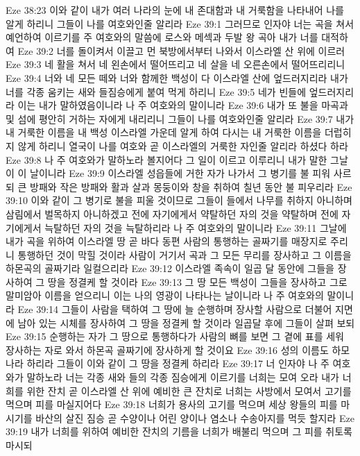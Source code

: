 Eze 38:23  이와 같이 내가 여러 나라의 눈에 내 존대함과 내 거룩함을 나타내어 나를 알게 하리니 그들이 나를 여호와인줄 알리라
Eze 39:1  그러므로 인자야 너는 곡을 쳐서 예언하여 이르기를 주 여호와의 말씀에 로스와 메섹과 두발 왕 곡아 내가 너를 대적하여
Eze 39:2  너를 돌이켜서 이끌고 먼 북방에서부터 나와서 이스라엘 산 위에 이르러
Eze 39:3  네 활을 쳐서 네 왼손에서 떨어뜨리고 네 살을 네 오른손에서 떨어뜨리리니
Eze 39:4  너와 네 모든 떼와 너와 함께한 백성이 다 이스라엘 산에 엎드러지리라 내가 너를 각종 움키는 새와 들짐승에게 붙여 먹게 하리니
Eze 39:5  네가 빈들에 엎드러지리라 이는 내가 말하였음이니라 나 주 여호와의 말이니라
Eze 39:6  내가 또 불을 마곡과 및 섬에 평안히 거하는 자에게 내리리니 그들이 나를 여호와인줄 알리라
Eze 39:7  내가 내 거룩한 이름을 내 백성 이스라엘 가운데 알게 하여 다시는 내 거룩한 이름을 더럽히지 않게 하리니 열국이 나를 여호와 곧 이스라엘의 거룩한 자인줄 알리라 하셨다 하라
Eze 39:8  나 주 여호와가 말하노라 볼지어다 그 일이 이르고 이루리니 내가 말한 그날이 이 날이니라
Eze 39:9  이스라엘 성읍들에 거한 자가 나가서 그 병기를 불 피워 사르되 큰 방패와 작은 방패와 활과 살과 몽둥이와 창을 취하여 칠년 동안 불 피우리라
Eze 39:10  이와 같이 그 병기로 불을 피울 것이므로 그들이 들에서 나무를 취하지 아니하며 삼림에서 벌목하지 아니하겠고 전에 자기에게서 약탈하던 자의 것을 약탈하며 전에 자기에게서 늑탈하던 자의 것을 늑탈하리라 나 주 여호와의 말이니라
Eze 39:11  그날에 내가 곡을 위하여 이스라엘 땅 곧 바다 동편 사람의 통행하는 골짜기를 매장지로 주리니 통행하던 것이 막힐 것이라 사람이 거기서 곡과 그 모든 무리를 장사하고 그 이름을 하몬곡의 골짜기라 일컬으리라
Eze 39:12  이스라엘 족속이 일곱 달 동안에 그들을 장사하여 그 땅을 정결케 할 것이라
Eze 39:13  그 땅 모든 백성이 그들을 장사하고 그로 말미암아 이름을 얻으리니 이는 나의 영광이 나타나는 날이니라 나 주 여호와의 말이니라
Eze 39:14  그들이 사람을 택하여 그 땅에 늘 순행하며 장사할 사람으로 더불어 지면에 남아 있는 시체를 장사하여 그 땅을 정결케 할 것이라 일곱달 후에 그들이 살펴 보되
Eze 39:15  순행하는 자가 그 땅으로 통행하다가 사람의 뼈를 보면 그 곁에 표를 세워 장사하는 자로 와서 하몬곡 골짜기에 장사하게 할 것이요
Eze 39:16  성의 이름도 하모나라 하리라 그들이 이와 같이 그 땅을 정결케 하리라
Eze 39:17  너 인자야 나 주 여호와가 말하노라 너는 각종 새와 들의 각종 짐승에게 이르기를 너희는 모여 오라 내가 너희를 위한 잔치 곧 이스라엘 산 위에 예비한 큰 잔치로 너희는 사방에서 모여서 고기를 먹으며 피를 마실지어다
Eze 39:18  너희가 용사의 고기를 먹으며 세상 왕들의 피를 마시기를 바산의 살진 짐승 곧 수양이나 어린 양이나 염소나 수송아지를 먹듯 할지라
Eze 39:19  내가 너희를 위하여 예비한 잔치의 기름을 너희가 배불리 먹으며 그 피를 취토록 마시되
